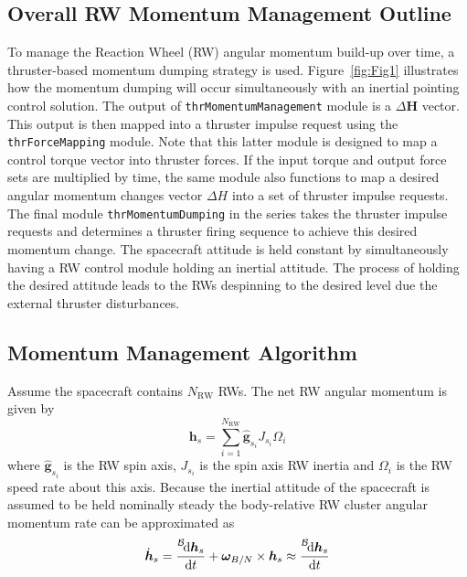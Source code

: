 \documentclass[]{BasiliskReportMemo}
\begin{document}
\subsection{Overall RW Momentum Management Outline}
To manage the Reaction Wheel (RW) angular momentum build-up over time, a thruster-based momentum dumping strategy is used.  Figure~\ref{fig:Fig1} illustrates how the momentum dumping will occur simultaneously with an inertial pointing control solution.   The output of {\tt thrMomentumManagement} module is a $\Delta \bm H$ vector.  This output is then mapped into a thruster impulse request using the {\tt thrForceMapping} module.  Note that this latter module is designed to map a control torque vector into thruster forces.  If the input torque and output force sets are multiplied by time,  the same module also functions to map a desired angular momentum changes vector $\Delta H$ into a set of thruster impulse requests.  The final module {\tt thrMomentumDumping} in the series takes the thruster impulse requests and determines a thruster firing sequence to achieve this desired momentum change.  The spacecraft attitude is held constant by simultaneously having a RW control module holding an inertial attitude.  The process of holding the desired attitude leads to the RWs despinning to the desired level due the external thruster disturbances.  


\subsection{Momentum Management Algorithm}
Assume the spacecraft contains $N_{\text{RW}}$ RWs. The net RW angular momentum is given by
\begin{equation}
	\bm h_{s} = \sum_{i=1}^{N_{\text{RW}}} \hat{\bm g}_{s_{i}} J_{s_{i}} \Omega_{i}
\end{equation} 
where $\hat{\bm g}_{s_{i}}$ is the RW spin axis, $J_{s_{i}}$ is the spin axis RW inertia and $\Omega_{i}$ is the RW speed rate about this axis.  
Because the inertial attitude of the spacecraft is assumed to be held nominally steady the body-relative RW cluster angular momentum rate can be approximated as 
\begin{equation}
	\dot{\bm h}_{s} = \frac{\leftexp{B}{\D}\bm h_{s}}{\D t} + \bm\omega_{B/N} \times \bm h_{s} \approx \frac{\leftexp{B}{\D}\bm h_{s}}{\D t}
\end{equation}
\end{document}
